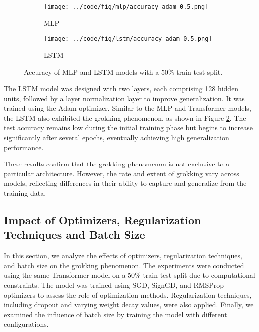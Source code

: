 \documentclass{article}
\begin{document}
\begin{figure}[ht]
    \centering
    \begin{subfigure}{0.45\textwidth}
        \texttt{[image: ../code/fig/mlp/accuracy-adam-0.5.png]}
        \caption{MLP}
        \label{fig:mlp-accuracy}
    \end{subfigure}
    \begin{subfigure}{0.45\textwidth}
        \texttt{[image: ../code/fig/lstm/accuracy-adam-0.5.png]}
        \caption{LSTM}
        \label{fig:lstm-accuracy}
    \end{subfigure}
    \caption{Accuracy of MLP and LSTM models with a $50\%$ train-test split.}
    \label{fig:mlp-lstm-accuracy}
\end{figure}

The LSTM model was designed with two layers, each comprising 128 hidden units, followed by a layer normalization layer to improve generalization. It was trained using the Adam optimizer. Similar to the MLP and Transformer models, the LSTM also exhibited the grokking phenomenon, as shown in Figure \ref{fig:lstm-accuracy}. The test accuracy remains low during the initial training phase but begins to increase significantly after several epochs, eventually achieving high generalization performance.

These results confirm that the grokking phenomenon is not exclusive to a particular architecture. However, the rate and extent of grokking vary across models, reflecting differences in their ability to capture and generalize from the training data.

\subsection{Impact of Optimizers, Regularization Techniques and Batch Size}

In this section, we analyze the effects of optimizers, regularization techniques, and batch size on the grokking phenomenon. The experiments were conducted using the same Transformer model on a $50\%$ train-test split due to computational constraints. The model was trained using SGD, SignGD, and RMSProp optimizers to assess the role of optimization methods. Regularization techniques, including dropout and varying weight decay values, were also applied. Finally, we examined the influence of batch size by training the model with different configurations.
\end{document}
